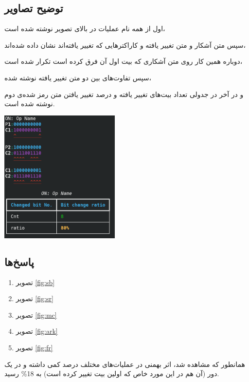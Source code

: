 \documentclass[dvipsnames, svgnames, x11names]{article}
\begin{document}
\subsection{توضیح تصاویر}
\begin{multicols}{2}
اول از همه نام عملیات در بالای تصویر نوشته شده است،

سپس متن آشکار و متن تغییر یافته و کاراکتر‌هایی که تغییر یافته‌اند نشان داده شده‌اند،

دوباره همین کار روی متن آشکاری که بیت اول آن فرق کرده است تکرار شده است،

سپس تفاوت‌های بین دو متن تغییر یافته نوشته شده،

و در آخر در جدولی تعداد بیت‌های تغییر یافته و درصد تغییر یافتن متن رمز شده‌ی دوم نوشته شده است.

\includegraphics[width=0.45\textwidth, height=0.35\textheight]{exam}
\end{multicols}

\subsection{پاسخ‌ها}
\begin{enumerate}[label=\alph*)]
\item {}
تصویر
\ref{fig:sb}

\item {}
تصویر
\ref{fig:sr}

\item {}
تصویر
\ref{fig:mc}

\item {}
تصویر
\ref{fig:ark}

\item {}
تصویر
\ref{fig:fr}
\end{enumerate}

همانطور که مشاهده شد، اثر بهمنی در عملیات‌های مختلف درصد کمی داشته و در یک دور (آن هم در این مورد خاص که اولین بیت تغییر کرده است) به 18\% رسید.
\end{document}
